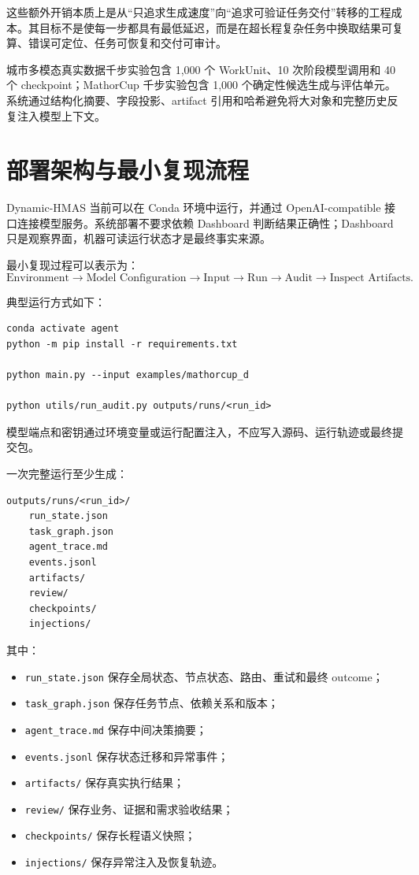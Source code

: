 \documentclass[UTF8,a4paper,12pt,oneside]{ctexbook}
\begin{document}
这些额外开销本质上是从“只追求生成速度”向“追求可验证任务交付”转移的工程成本。其目标不是使每一步都具有最低延迟，而是在超长程复杂任务中换取结果可复算、错误可定位、任务可恢复和交付可审计。

城市多模态真实数据千步实验包含 1,000 个 WorkUnit、10 次阶段模型调用和 40 个 checkpoint；MathorCup 千步实验包含 1,000 个确定性候选生成与评估单元。系统通过结构化摘要、字段投影、artifact 引用和哈希避免将大对象和完整历史反复注入模型上下文。


\section{部署架构与最小复现流程}

Dynamic-HMAS 当前可以在 Conda 环境中运行，并通过 OpenAI-compatible 接口连接模型服务。系统部署不要求依赖 Dashboard 判断结果正确性；Dashboard 只是观察界面，机器可读运行状态才是最终事实来源。

最小复现过程可以表示为：
\[
\text{Environment}
\rightarrow
\text{Model Configuration}
\rightarrow
\text{Input}
\rightarrow
\text{Run}
\rightarrow
\text{Audit}
\rightarrow
\text{Inspect Artifacts}.
\]

典型运行方式如下：

\begin{lstlisting}[caption={Dynamic-HMAS 最小运行与审计流程}]
conda activate agent
python -m pip install -r requirements.txt

python main.py --input examples/mathorcup_d

python utils/run_audit.py outputs/runs/<run_id>
\end{lstlisting}

模型端点和密钥通过环境变量或运行配置注入，不应写入源码、运行轨迹或最终提交包。

一次完整运行至少生成：

\begin{lstlisting}[caption={典型机器可审计运行目录}]
outputs/runs/<run_id>/
    run_state.json
    task_graph.json
    agent_trace.md
    events.jsonl
    artifacts/
    review/
    checkpoints/
    injections/
\end{lstlisting}

其中：

\begin{itemize}
    \item \texttt{run\_state.json} 保存全局状态、节点状态、路由、重试和最终 outcome；
    \item \texttt{task\_graph.json} 保存任务节点、依赖关系和版本；
    \item \texttt{agent\_trace.md} 保存中间决策摘要；
    \item \texttt{events.jsonl} 保存状态迁移和异常事件；
    \item \texttt{artifacts/} 保存真实执行结果；
    \item \texttt{review/} 保存业务、证据和需求验收结果；
    \item \texttt{checkpoints/} 保存长程语义快照；
    \item \texttt{injections/} 保存异常注入及恢复轨迹。
\end{itemize}
\end{document}
